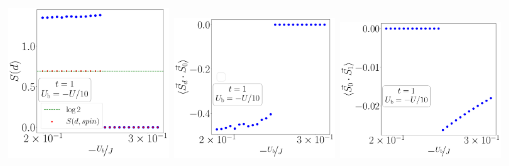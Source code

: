 \documentclass{report}
\numberwithin{equation}{section}
\begin{document}
\begin{center}
	\includegraphics[width=0.32\textwidth]{../figures/EE-d-D=1000.00000,t=1.00000,J=30.00000,V=1.50000J,Ub=-Uby10,N=4,U=59.85787,93.55363,25.pdf}
	\includegraphics[width=0.32\textwidth]{../figures/corr-d0-D=1000.00000,t=1.00000,J=30.00000,V=1.50000J,Ub=-Uby10,N=4,U=59.85787,93.55363,25.pdf}
	\includegraphics[width=0.32\textwidth]{../figures/r-vec-corr-01-D=1000.00000,t=1.00000,J=30.00000,V=1.50000J,Ub=-Uby10,N=4,U=59.85787,93.55363,25.pdf}
\end{center}
\end{document}
